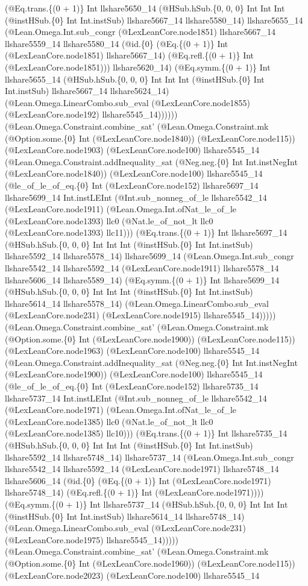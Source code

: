 \documentclass[11pt]{article}
\begin{document}
(@Eq.trans.\{(0 + 1)\} Int llshare5650\_14 (@HSub.hSub.\{0, 0, 0\} Int Int Int (@instHSub.\{0\} Int Int.instSub) llshare5667\_14 llshare5580\_14) llshare5655\_14 (@Lean.Omega.Int.sub\_congr (@LexLeanCore.node1851) llshare5667\_14 llshare5559\_14 llshare5580\_14 (@id.\{0\} (@Eq.\{(0 + 1)\} Int (@LexLeanCore.node1851) llshare5667\_14) (@Eq.refl.\{(0 + 1)\} Int (@LexLeanCore.node1851))) llshare5620\_14) (@Eq.symm.\{(0 + 1)\} Int llshare5655\_14 (@HSub.hSub.\{0, 0, 0\} Int Int Int (@instHSub.\{0\} Int Int.instSub) llshare5667\_14 llshare5624\_14) (@Lean.Omega.LinearCombo.sub\_eval (@LexLeanCore.node1855) (@LexLeanCore.node192) llshare5545\_14)))))) (@Lean.Omega.Constraint.combine\_sat' (@Lean.Omega.Constraint.mk (@Option.some.\{0\} Int (@LexLeanCore.node1840)) (@LexLeanCore.node115)) (@LexLeanCore.node1903) (@LexLeanCore.node100) llshare5545\_14 (@Lean.Omega.Constraint.addInequality\_sat (@Neg.neg.\{0\} Int Int.instNegInt (@LexLeanCore.node1840)) (@LexLeanCore.node100) llshare5545\_14 (@le\_of\_le\_of\_eq.\{0\} Int (@LexLeanCore.node152) llshare5697\_14 llshare5699\_14 Int.instLEInt (@Int.sub\_nonneg\_of\_le llshare5542\_14 (@LexLeanCore.node1911) (@Lean.Omega.Int.ofNat\_le\_of\_le (@LexLeanCore.node1393) llc0 (@Nat.le\_of\_not\_lt llc0 (@LexLeanCore.node1393) llc11))) (@Eq.trans.\{(0 + 1)\} Int llshare5697\_14 (@HSub.hSub.\{0, 0, 0\} Int Int Int (@instHSub.\{0\} Int Int.instSub) llshare5592\_14 llshare5578\_14) llshare5699\_14 (@Lean.Omega.Int.sub\_congr llshare5542\_14 llshare5592\_14 (@LexLeanCore.node1911) llshare5578\_14 llshare5606\_14 llshare5589\_14) (@Eq.symm.\{(0 + 1)\} Int llshare5699\_14 (@HSub.hSub.\{0, 0, 0\} Int Int Int (@instHSub.\{0\} Int Int.instSub) llshare5614\_14 llshare5578\_14) (@Lean.Omega.LinearCombo.sub\_eval (@LexLeanCore.node231) (@LexLeanCore.node1915) llshare5545\_14))))) (@Lean.Omega.Constraint.combine\_sat' (@Lean.Omega.Constraint.mk (@Option.some.\{0\} Int (@LexLeanCore.node1900)) (@LexLeanCore.node115)) (@LexLeanCore.node1963) (@LexLeanCore.node100) llshare5545\_14 (@Lean.Omega.Constraint.addInequality\_sat (@Neg.neg.\{0\} Int Int.instNegInt (@LexLeanCore.node1900)) (@LexLeanCore.node100) llshare5545\_14 (@le\_of\_le\_of\_eq.\{0\} Int (@LexLeanCore.node152) llshare5735\_14 llshare5737\_14 Int.instLEInt (@Int.sub\_nonneg\_of\_le llshare5542\_14 (@LexLeanCore.node1971) (@Lean.Omega.Int.ofNat\_le\_of\_le (@LexLeanCore.node1385) llc0 (@Nat.le\_of\_not\_lt llc0 (@LexLeanCore.node1385) llc10))) (@Eq.trans.\{(0 + 1)\} Int llshare5735\_14 (@HSub.hSub.\{0, 0, 0\} Int Int Int (@instHSub.\{0\} Int Int.instSub) llshare5592\_14 llshare5748\_14) llshare5737\_14 (@Lean.Omega.Int.sub\_congr llshare5542\_14 llshare5592\_14 (@LexLeanCore.node1971) llshare5748\_14 llshare5606\_14 (@id.\{0\} (@Eq.\{(0 + 1)\} Int (@LexLeanCore.node1971) llshare5748\_14) (@Eq.refl.\{(0 + 1)\} Int (@LexLeanCore.node1971)))) (@Eq.symm.\{(0 + 1)\} Int llshare5737\_14 (@HSub.hSub.\{0, 0, 0\} Int Int Int (@instHSub.\{0\} Int Int.instSub) llshare5614\_14 llshare5748\_14) (@Lean.Omega.LinearCombo.sub\_eval (@LexLeanCore.node231) (@LexLeanCore.node1975) llshare5545\_14))))) (@Lean.Omega.Constraint.combine\_sat' (@Lean.Omega.Constraint.mk (@Option.some.\{0\} Int (@LexLeanCore.node1960)) (@LexLeanCore.node115)) (@LexLeanCore.node2023) (@LexLeanCore.node100) llshare5545\_14 
\end{document}
